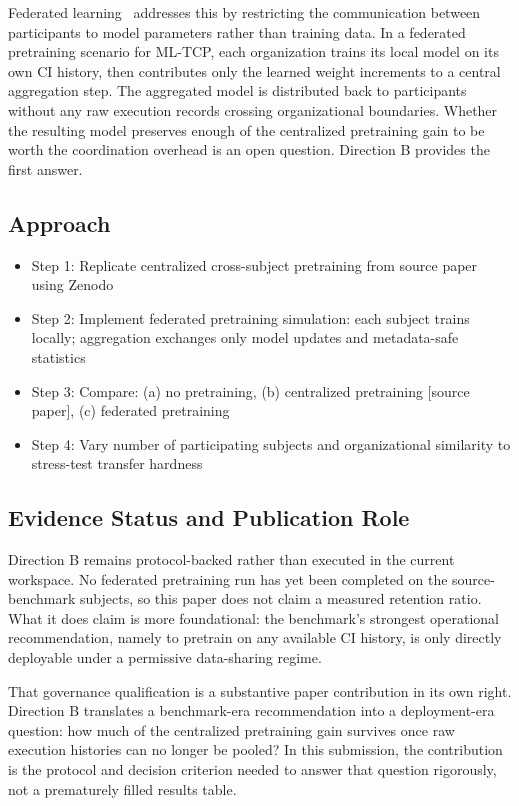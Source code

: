 \documentclass[10pt,conference]{IEEEtran}
\begin{document}
Federated learning~\cite{federatedlearning} addresses this by restricting the communication between participants to model parameters rather than training data. In a federated pretraining scenario for ML-TCP, each organization trains its local model on its own CI history, then contributes only the learned weight increments to a central aggregation step. The aggregated model is distributed back to participants without any raw execution records crossing organizational boundaries. Whether the resulting model preserves enough of the centralized pretraining gain to be worth the coordination overhead is an open question. Direction B provides the first answer.

\subsection{Approach}

\begin{itemize}[leftmargin=*]
\item Step 1: Replicate centralized cross-subject pretraining from source paper using Zenodo~\cite{sourcepaperreplicationpackage}
\item Step 2: Implement federated pretraining simulation: each subject trains locally; aggregation exchanges only model updates and metadata-safe statistics
\item Step 3: Compare: (a) no pretraining, (b) centralized pretraining [source paper], (c) federated pretraining
\item Step 4: Vary number of participating subjects and organizational similarity to stress-test transfer hardness
\end{itemize}

\subsection{Evidence Status and Publication Role}

Direction B remains protocol-backed rather than executed in the current workspace. No federated pretraining run has yet been completed on the source-benchmark subjects, so this paper does not claim a measured retention ratio. What it does claim is more foundational: the benchmark's strongest operational recommendation, namely to pretrain on any available CI history, is only directly deployable under a permissive data-sharing regime.

That governance qualification is a substantive paper contribution in its own right. Direction B translates a benchmark-era recommendation into a deployment-era question: how much of the centralized pretraining gain survives once raw execution histories can no longer be pooled? In this submission, the contribution is the protocol and decision criterion needed to answer that question rigorously, not a prematurely filled results table.
\end{document}
